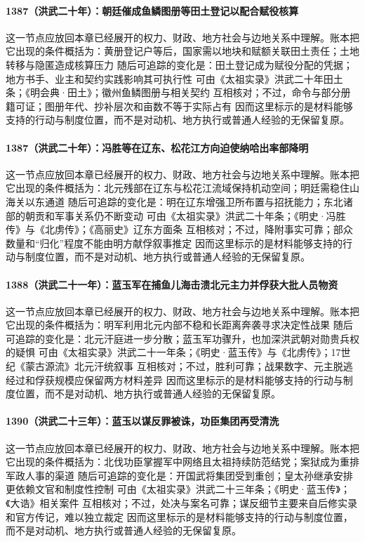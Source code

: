 \paragraph{1387（洪武二十年）：朝廷催成鱼鳞图册等田土登记以配合赋役核算} 这一节点应放回本章已经展开的权力、财政、地方社会与边地关系中理解。账本把它出现的条件概括为：黄册登记户等后，国家需以地块和赋额关联田土责任；土地转移与隐匿造成核算压力 随后可追踪的变化是：田土登记成为赋役分配的凭据；地方书手、业主和契约实践影响其可执行性 可由《太祖实录》洪武二十年田土条；《明会典·田土》；徽州鱼鳞图册与相关契约 互相核对；不过，命令与部分册籍可证；图册年代、抄补层次和亩数不等于实际占有 因而这里标示的是材料能够支持的行动与制度位置，而不是对动机、地方执行或普通人经验的无保留复原。

\paragraph{1387（洪武二十年）：冯胜等在辽东、松花江方向迫使纳哈出率部降明} 这一节点应放回本章已经展开的权力、财政、地方社会与边地关系中理解。账本把它出现的条件概括为：北元残部在辽东与松花江流域保持机动空间；明廷需稳住山海关以东通道 随后可追踪的变化是：明在辽东增强卫所布置与招抚能力；东北诸部的朝贡和军事关系仍不断变动 可由《太祖实录》洪武二十年条；《明史·冯胜传》与《北虏传》；《高丽史》辽东方面条 互相核对；不过，降附事实可靠；部众数量和“归化”程度不能由明方献俘叙事推定 因而这里标示的是材料能够支持的行动与制度位置，而不是对动机、地方执行或普通人经验的无保留复原。

\paragraph{1388（洪武二十一年）：蓝玉军在捕鱼儿海击溃北元主力并俘获大批人员物资} 这一节点应放回本章已经展开的权力、财政、地方社会与边地关系中理解。账本把它出现的条件概括为：明军利用北元内部不稳和长距离奔袭寻求决定性战果 随后可追踪的变化是：北元汗庭进一步分散；蓝玉军功骤升，也加深洪武朝对勋贵兵权的疑惧 可由《太祖实录》洪武二十一年条；《明史·蓝玉传》与《北虏传》；17世纪《蒙古源流》北元汗统叙事 互相核对；不过，胜利可靠；战果数字、元主脱逃经过和俘获规模应保留两方材料差异 因而这里标示的是材料能够支持的行动与制度位置，而不是对动机、地方执行或普通人经验的无保留复原。

\paragraph{1390（洪武二十三年）：蓝玉以谋反罪被诛，功臣集团再受清洗} 这一节点应放回本章已经展开的权力、财政、地方社会与边地关系中理解。账本把它出现的条件概括为：北伐功臣掌握军中网络且太祖持续防范结党；案狱成为重排军政人事的渠道 随后可追踪的变化是：开国武将集团受到重创；皇太孙继承安排更依赖文官和制度性控制 可由《太祖实录》洪武二十三年条；《明史·蓝玉传》；《大诰》相关案件 互相核对；不过，处决与案名可靠；谋反细节主要来自后修实录和官方传记，难以独立裁定 因而这里标示的是材料能够支持的行动与制度位置，而不是对动机、地方执行或普通人经验的无保留复原。

